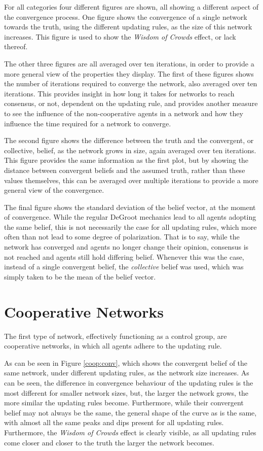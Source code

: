 \documentclass[a4paper, 12pt]{report}
\begin{document}
\noindent For all categories four different figures are shown, all showing a different aspect of the convergence process. One figure shows the convergence of a single network towards the truth, using the different updating rules, as the size of this network increases. This figure is used to show the \emph{Wisdom of Crowds} effect, or lack thereof. 

\noindent The other three figures are all averaged over ten iterations, in order to provide a more general view of the properties they display. The first of these figures shows the number of iterations required to converge the network, also averaged over ten iterations. This provides insight in how long it takes for networks to reach consensus, or not, dependent on the updating rule, and provides another measure to see the influence of the non-cooperative agents in a network and how they influence the time required for a network to converge.

\noindent The second figure shows the difference between the truth and the convergent, or collective, belief, as the network grows in size, again averaged over ten iterations. This figure provides the same information as the first plot, but by showing the distance between convergent beliefs and the assumed truth, rather than these values themselves, this can be averaged over multiple iterations to provide a more general view of the convergence.

\noindent  The final figure shows the standard deviation of the belief vector, at the moment of convergence. While the regular DeGroot mechanics lead to all agents adopting the same belief, this is not necessarily the case for all updating rules, which more often than not lead to some degree of polarization. That is to say, while the network has converged and agents no longer change their opinion, consensus is not reached and agents still hold differing belief. Whenever this was the case, instead of a single convergent belief, the \emph{collective} belief was used, which was simply taken to be the mean of the belief vector.

\newpage

\section{Cooperative Networks}
\label{results:coop}
The first type of network, effectively functioning as a control group, are cooperative networks, in which all agents adhere to the updating rule. 

\noindent As can be seen in Figure \ref{coop:conv}, which shows the convergent belief of the same network, under different updating rules, as the network size increases. As can be seen, the difference in convergence behaviour of the updating rules is the most different for smaller network sizes, but, the larger the network grows, the more similar the updating rules become. Furthermore, while their convergent belief may not always be the same, the general shape of the curve as is the same, with almost all the same peaks and dips present for all updating rules. Furthermore, the \emph{Wisdom of Crowds} effect is clearly visible, as all updating rules come closer and closer to the truth the larger the network becomes.
\end{document}
